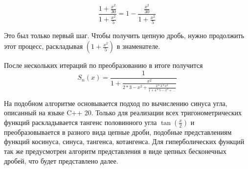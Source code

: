\documentclass{article}
\begin{document}
    $$\frac{1 + \frac{x^2}{30}}{1 + \frac{x^2}{5}} = 1 - \frac{\frac{x^2}{30}}{1 + \frac{x^2}{5}}$$

    Это был только первый шаг. 
    Чтобы получить цепную дробь, нужно продолжить этот процесс, 
    раскладывая $(1 + \frac{x^2}{5})$ в знаменателе.

    После нескольких итераций по преобразованию в итоге получится
    $$S_n(x) = \frac{1}{1 + \frac{x^2}{2*3 - x^2 + \frac{2*3*x^2}{1 + 4*5 - x^2 + \dots}}}$$

    На подобном алгоритме основывается подход по вычислению синуса угла, описанный на языке C++ 20.
    Только для реализации всех тригонометрических функций раскладывается тангенс половинного угла $\tan(\frac{x}{2})$
    и преобразовывается в разного вида цепные дроби, подобные представлениям функций
    косинуса, синуса, тангенса, котангенса.
    Для гиперболических функций так же предусмотрен алгоритм представления
    в виде цепных бесконечных дробей, что будет представлено далее.
\end{document}
